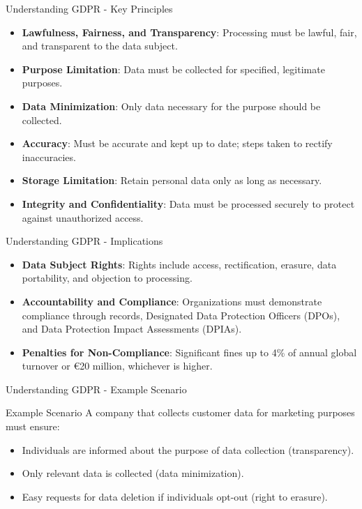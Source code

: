 \documentclass[aspectratio=169]{beamer}
\begin{document}
\begin{frame}[fragile]{Understanding GDPR - Key Principles}
    \begin{itemize}
        \item \textbf{Lawfulness, Fairness, and Transparency}: Processing must be lawful, fair, and transparent to the data subject.
        \item \textbf{Purpose Limitation}: Data must be collected for specified, legitimate purposes.
        \item \textbf{Data Minimization}: Only data necessary for the purpose should be collected.
        \item \textbf{Accuracy}: Must be accurate and kept up to date; steps taken to rectify inaccuracies.
        \item \textbf{Storage Limitation}: Retain personal data only as long as necessary.
        \item \textbf{Integrity and Confidentiality}: Data must be processed securely to protect against unauthorized access.
    \end{itemize}
\end{frame}

\begin{frame}[fragile]{Understanding GDPR - Implications}
    \begin{itemize}
        \item \textbf{Data Subject Rights}: Rights include access, rectification, erasure, data portability, and objection to processing.
        \item \textbf{Accountability and Compliance}: Organizations must demonstrate compliance through records, Designated Data Protection Officers (DPOs), and Data Protection Impact Assessments (DPIAs).
        \item \textbf{Penalties for Non-Compliance}: Significant fines up to 4\% of annual global turnover or €20 million, whichever is higher.
    \end{itemize}
\end{frame}

\begin{frame}[fragile]{Understanding GDPR - Example Scenario}
    \begin{block}{Example Scenario}
        A company that collects customer data for marketing purposes must ensure:
        \begin{itemize}
            \item Individuals are informed about the purpose of data collection (transparency).
            \item Only relevant data is collected (data minimization).
            \item Easy requests for data deletion if individuals opt-out (right to erasure).
        \end{itemize}
    \end{block}
\end{frame}
\end{document}
